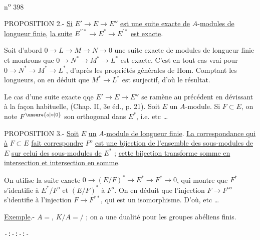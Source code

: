 n\textsuperscript{o} 398

PROPOSITION 2.- \uline{Si} $E'\longrightarrow E\longrightarrow E''$ \uline{est une suite exacte de} $A$-\uline{modules de longueur finie}, \uline{la suite} $E^{\prime\prime\ast}\longrightarrow E^\ast\longrightarrow E^{\prime\ast}$ \uline{est exacte}.

Soit d'abord $0\longrightarrow L\longrightarrow M\longrightarrow N\longrightarrow0$ une suite exacte de modules de longueur finie et montrons que $0\longrightarrow N^\ast\longrightarrow M^\ast\longrightarrow L^\ast$ est exacte. C'est en tout cas vrai pour $0\longrightarrow N^\ast\longrightarrow M^\ast\longrightarrow L^\ast$, d'après les propriétés générales de Hom. Comptant les longueurs, on en déduit que $M^\ast\longrightarrow L^\ast$ est surjectif, d'où le résultat.

Le cas d'une suite exacte qqe $E'\longrightarrow E\longrightarrow E''$ se ramène au précédent en dévissant à la façon habituelle, (Chap. II, 3e éd., p. 21). Soit $E$ un $A$-module. Si $F\subset E$, on note $F^{\unsure{o|\circ|0}}$ son orthogonal dans $E^\ast$, i.e. etc \ldots

PROPOSITION 3.- \uline{Soit} $E$ \uline{un} $A$-\uline{module de longueur finie}. \uline{La correspondance qui à} $F\subset E$ \uline{fait correspondre} $F^o$ \uline{est une bijection de l'ensemble des sous-modules de} $E$ \uline{sur celui des sous-modules de} $E^\ast$ ; \uline{cette bijection transforme somme en intersection et intersection en somme}.

On utilise la suite exacte $0\longrightarrow(E/F)^\ast\longrightarrow E^\ast\longrightarrow F^\ast\longrightarrow0$, qui montre que $F^\ast$ s'identifie à $E^\ast/F^o$ et $(E/F)^\ast$ à $F^o$. On en déduit que l'injection $F\longrightarrow F^{oo}$ s'identifie à l'injection $F\longrightarrow F^{\ast\ast}$, qui est un isomorphisme. D'où, etc \ldots

\uline{Exemple}.- $A={}$, $K/A={}$$/$ ; on a une dualité pour les groupes abéliens finis.

\centerline{\texttt{-:-:-:-}}

